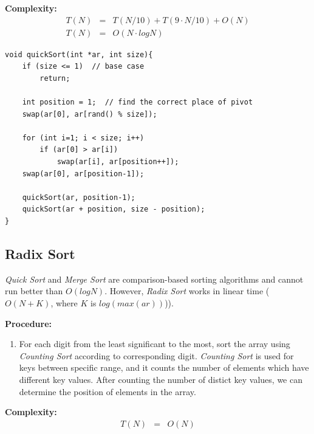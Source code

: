 \documentclass[12pt]{article}
\begin{document}
\textbf{Complexity: }
\begin{eqnarray*}
	T(N) &=& T(N / 10) + T(9\cdot N / 10) + O(N) \\
	T(N) &=& O(N \cdot logN)
\end{eqnarray*}
		
\begin{verbatim}
void quickSort(int *ar, int size){
    if (size <= 1)  // base case
        return;
	
    int position = 1;  // find the correct place of pivot
    swap(ar[0], ar[rand() % size]);
	
    for (int i=1; i < size; i++)
        if (ar[0] > ar[i])
            swap(ar[i], ar[position++]);
    swap(ar[0], ar[position-1]);
	
    quickSort(ar, position-1);
    quickSort(ar + position, size - position);
}
\end{verbatim}

\cleardoublepage
		\subsection{Radix Sort}

	\textit{Quick Sort} and \textit{Merge Sort} are comparison-based sorting algorithms and cannot run better than $O(log N)$. However, \textit{Radix Sort} works in linear time ($O(N + K)$, where $K$ is $log(max(ar))$)).

\textbf{Procedure: }
\begin{enumerate}
	\item For each digit from the least significant to the most, sort the array using \textit{Counting Sort} according to corresponding digit. \textit{Counting Sort} is used for keys between specific range, and it counts the number of elements which have different key values. After counting the number of distict key values, we can determine the position of elements in the array. 
\end{enumerate}	

\textbf{Complexity: }
\begin{eqnarray*}
	T(N) &=& O(N)
\end{eqnarray*}
\end{document}
